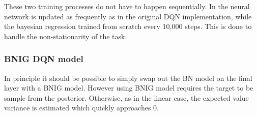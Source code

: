 These two training processes do not have to happen sequentially. In \cite{azziz_2018} the neural network is updated as frequently as in the original DQN implementation, while the bayesian regression trained from scratch every 10,000 steps. This is done to handle the non-stationarity of the task.

\subsubsection{BNIG DQN model}

In principle it should be possible to simply swap out the BN model on the final layer with a BNIG model. However using BNIG model requires the target to be sample from the posterior. Otherwise, as in the linear case, the expected value variance is estimated which quickly approaches 0.




\cleardoublepage